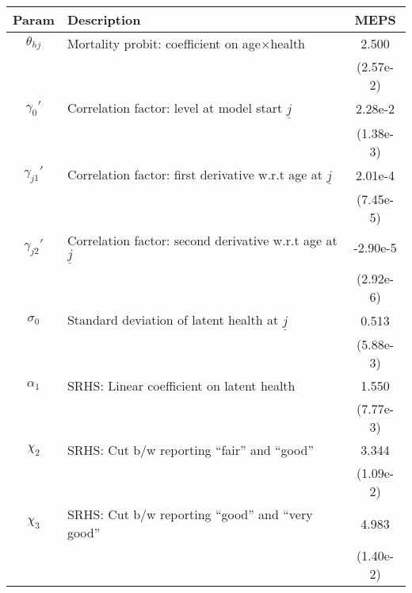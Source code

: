 \begin{table}[ht]\label{MEPSmenOtherParams}
\footnotesize
\begin{center}
\begin{tabular}{clc}
\hline \hline
Param & Description & MEPS \\
\hline
$\theta_{hj}$ & Mortality probit: coefficient on age$\times$health & 2.500 \\
 & & (2.57e-2) \\
$\gamma_{0}'$ & Correlation factor: level at model start $\underline{j}$ & 2.28e-2 \\
 & & (1.38e-3) \\
$\gamma_{j1}'$ & Correlation factor: first derivative w.r.t age at $\underline{j}$ & 2.01e-4 \\
 & & (7.45e-5) \\
$\gamma_{j2}'$ & Correlation factor: second derivative w.r.t age at $\underline{j}$ & -2.90e-5 \\
 & & (2.92e-6) \\
$\sigma_{0}$ & Standard deviation of latent health at $\underline{j}$ & 0.513 \\
 & & (5.88e-3) \\
$\alpha_1$ & SRHS: Linear coefficient on latent health & 1.550 \\
 & & (7.77e-3) \\
$\chi_2$ & SRHS: Cut b/w reporting ``fair'' and ``good'' & 3.344 \\
 & & (1.09e-2) \\
$\chi_3$ & SRHS: Cut b/w reporting ``good'' and ``very good'' & 4.983 \\
 & & (1.40e-2) \\
\hline\hline
\end{tabular}
\end{center}
\end{table}
